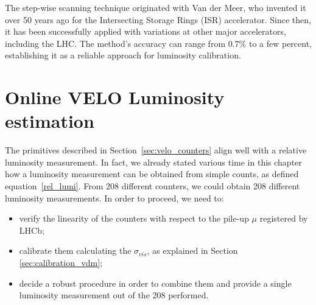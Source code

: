 The step-wise scanning technique originated with Van der Meer, who invented it over 50 years ago for the Intersecting Storage Rings (ISR) accelerator\cite{Carboni:156499}. Since then, it has been successfully applied with variations at other major accelerators\cite{Rubbia:1025746}, including the LHC. The method's accuracy can range from 0.7\% to a few percent, establishing it as a reliable approach for luminosity calibration.


\section{Online VELO Luminosity estimation}\label{lumi_measure}
The primitives described in Section~\ref{sec:velo_counters} align well with a relative luminosity measurement. In fact, we already stated various time in this chapter how a luminosity measurement can be obtained from simple counts, as defined equation~\eqref{rel_lumi}. From 208 different counters, we could obtain 208 different luminosity measurements. 
In order to proceed, we need to:
\begin{itemize}
    \item verify the linearity of the counters with respect to the pile-up $\mu$ registered by LHCb;
    \item calibrate them calculating the $\sigma_{vis}$, as explained in Section \ref{sec:calibration_vdm};
    \item decide a robust procedure in order to combine them and provide a single luminosity measurement out of the 208 performed.
\end{itemize}

